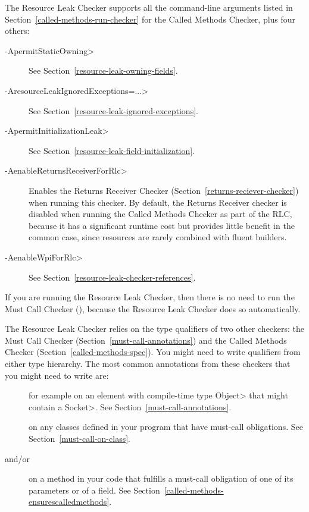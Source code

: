 The Resource Leak Checker supports all the command-line arguments
listed in Section~\ref{called-methods-run-checker} for
the Called Methods Checker, plus four others:

\begin{description}
\item[\<-ApermitStaticOwning>]
  See Section~\ref{resource-leak-owning-fields}.
\item[\<-AresourceLeakIgnoredExceptions=...>]
  See Section~\ref{resource-leak-ignored-exceptions}.
\item[\<-ApermitInitializationLeak>]
  See Section~\ref{resource-leak-field-initialization}.
\item[\<-AenableReturnsReceiverForRlc>]
  Enables the Returns Receiver Checker (Section~\ref{returns-reciever-checker})
  when running this checker. By default, the Returns Receiver checker is
  disabled when running the Called Methods Checker as part of the RLC,
  because it has a significant runtime cost but provides little benefit in the common case,
  since resources are rarely combined with fluent builders.
\item[\<-AenableWpiForRlc>]
  See Section~\ref{resource-leak-checker-references}.
\end{description}

If you are running the Resource Leak Checker, then there is no need to run
the Must Call Checker (), because the
Resource Leak Checker does so automatically.



The Resource Leak Checker relies on the type qualifiers of two other checkers:
the Must Call Checker (Section~\ref{must-call-annotations}) and
the Called Methods Checker (Section~\ref{called-methods-spec}). You might need
to write qualifiers from either type hierarchy. The most common annotations from
these checkers that you might need to write are:

\begin{description}

\item[]
for example on an element with compile-time type \<Object> that might contain a \<Socket>.
See Section~\ref{must-call-annotations}.

\item[]
on any classes defined in your program that have must-call obligations. See Section~\ref{must-call-on-class}.

\item[ and/or
      ]
on a method in your code that fulfills a must-call obligation of one of its parameters or of a field.
See Section~\ref{called-methods-ensurescalledmethods}.

\end{description}

